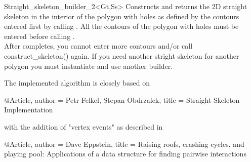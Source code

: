 \begin{ccRefClass}{Straight_skeleton_builder_2<Gt,Ss>}
\ccGlue
{}
{Constructs and returns the 2D straight skeleton in the interior of the polygon with holes as defined by the contours entered first by calling . All the contours of the polygon with holes must be entered before calling .\\
After  completes, you cannot enter more contours and/or call construct_skeleton() again. If you need another stright skeleton for another polygon you must instantiate and use another builder.}



The implemented algorithm is closely based on 


@Article{,
author = {Petr Felkel, Stepan Obdrzalek},
title = {Straight Skeleton Implementation}
}

with the addition of "vertex events" as described in

@Article{,
author = {Dave Eppstein},
title = {Raising roofs, crashing cycles, and playing pool: Applications of a data structure
for finding pairwise interactions}
}


\end{ccRefClass}
